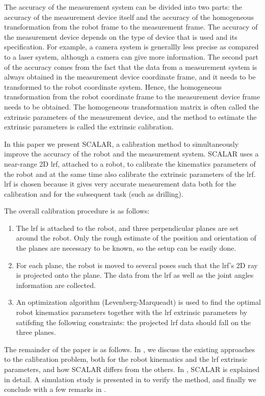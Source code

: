 The accuracy of the measurement system can be divided into two parts: the accuracy of the measurement device itself and the accuracy of the homogeneous transformation from the robot frame to the measurement frame. The accuracy of the measurement device depends on the type of device that is used and its specification. For example, a camera system is generallly less precise as compared to a laser system, although a camera can give more information. The second part of the accuracy comes from the fact that the data from a measurement system is always obtained in the measurement device coordinate frame, and it needs to be transformed to the robot coordinate system. Hence, the homogeneous transformation from the robot coordinate frame to the measurement device frame needs to be obtained. The homogeneous transformation matrix is often called the extrinsic parameters of the measurement device, and the method to estimate the extrinsic parameters is called the extrinsic calibration.  

In this paper we present SCALAR, a calibration method to simultaneously improve the accuracy of the robot and the measurement system. SCALAR uses a near-range 2D \ac{lrf}, attached to a robot, to calibrate the kinematics parameters of the robot and at the same time also calibrate the extrinsic parameters of the \ac{lrf}. \ac{lrf} is chosen because it gives very accurate measurement data both for the calibration and for the subsequent task (such as drilling).  

The overall calibration procedure is as follows:
\begin{enumerate}
\item The \ac{lrf} is attached to the robot, and three perpendicular planes are set around the robot. Only the rough estimate of the position and orientation of the planes are necessary to be known, so the setup can be easily done.
\item For each plane, the robot is moved to several poses such that the \ac{lrf}'s 2D ray is projected onto the plane. The data from the \ac{lrf} as well as the joint angles information are collected.
\item An optimization algorithm (Levenberg-Marqueadt) is used to find the optimal robot kinematics parameters together with the \ac{lrf} extrinsic parameters by satifsfing the following constraints: the projected \ac{lrf} data should fall on the three planes. 
\end{enumerate}

The remainder of the paper is as follows. In , we discuss the existing approaches to the calibration problem, both for the robot kinematics and the \ac{lrf} extrinsic parameters, and how SCALAR differs from the others. In , SCALAR is explained in detail. A simulation study is presented in  to verify the method, and finally we conclude with a few remarks in .  



